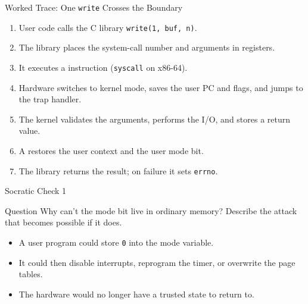 \documentclass[aspectratio=169]{beamer}
\begin{document}
\begin{frame}{Worked Trace: One \texttt{write} Crosses the Boundary}
  \begin{enumerate}
    \item User code calls the C library \texttt{write(1, buf, n)}.
    \item The library places the system-call number and arguments in registers.
    \item It executes a  instruction (\texttt{syscall} on x86-64).
    \item Hardware switches to kernel mode, saves the user PC and flags, and
      jumps to the trap handler.
    \item The kernel validates the arguments, performs the I/O, and stores a
      return value.
    \item A  restores the user context and the user mode
      bit.
    \item The library returns the result; on failure it sets \texttt{errno}.
  \end{enumerate}
  \vspace{0.15cm}
\end{frame}

\begin{frame}{Socratic Check 1}
  \begin{block}{Question}
    Why can't the mode bit live in ordinary memory? Describe the attack that
    becomes possible if it does.
  \end{block}
  \vspace{0.25cm}
  \begin{itemize}
    \item A user program could store \texttt{0} into the mode variable.
    \item It could then disable interrupts, reprogram the timer, or overwrite
      the page tables.
    \item The hardware would no longer have a trusted state to return to.
  \end{itemize}
  \vspace{0.2cm}
\end{frame}

\end{document}
